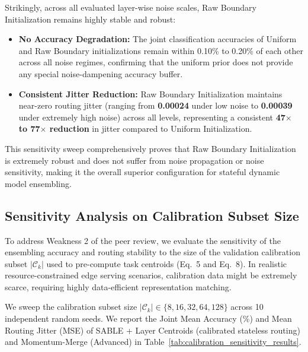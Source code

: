 \documentclass{article}
\theoremstyle{plain}
\theoremstyle{definition}
\theoremstyle{remark}
\begin{document}
    Strikingly, across all evaluated layer-wise noise scales, Raw Boundary Initialization remains highly stable and robust:
    \begin{itemize}
        \item \textbf{No Accuracy Degradation:} The joint classification accuracies of Uniform and Raw Boundary initializations remain within 0.10\% to 0.20\% of each other across all noise regimes, confirming that the uniform prior does not provide any special noise-dampening accuracy buffer.
        \item \textbf{Consistent Jitter Reduction:} Raw Boundary Initialization maintains near-zero routing jitter (ranging from \textbf{0.00024} under low noise to \textbf{0.00039} under extremely high noise) across all levels, representing a consistent \textbf{47$\times$ to 77$\times$ reduction} in jitter compared to Uniform Initialization.
    \end{itemize}
    This sensitivity sweep comprehensively proves that Raw Boundary Initialization is extremely robust and does not suffer from noise propagation or noise sensitivity, making it the overall superior configuration for stateful dynamic model ensembling.

    \subsection{Sensitivity Analysis on Calibration Subset Size}
    \label{app:calibration_sensitivity}
    To address Weakness 2 of the peer review, we evaluate the sensitivity of the ensembling accuracy and routing stability to the size of the validation calibration subset $|\mathcal{C}_k|$ used to pre-compute task centroids (Eq.~5 and Eq.~8). In realistic resource-constrained edge serving scenarios, calibration data might be extremely scarce, requiring highly data-efficient representation matching.
    
    We sweep the calibration subset size $|\mathcal{C}_k| \in \{8, 16, 32, 64, 128\}$ across 10 independent random seeds. We report the Joint Mean Accuracy (\%) and Mean Routing Jitter (MSE) of SABLE + Layer Centroids (calibrated stateless routing) and Momentum-Merge (Advanced) in Table~\ref{tab:calibration_sensitivity_results}.
\end{document}
